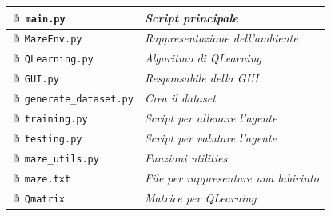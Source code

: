 \begin{center}
	\begin{tabular}{m{15em}  m{20em}}
		\includegraphics[height=0.8em]{img/paper.png} \lstinline[style=cmd]|main.py| & \textit{Script principale}\\[0.2em]
		\hline 
		\includegraphics[height=0.8em]{img/paper.png} \lstinline[style=cmd]|MazeEnv.py| & \textit{Rappresentazione dell'ambiente} \rule{0pt}{2.6ex}\\
		\hline
		\includegraphics[height=0.8em]{img/paper.png} \lstinline[style=cmd]|QLearning.py| & \textit{Algoritmo di QLearning} \rule{0pt}{2.6ex}\\
		\hline
		\includegraphics[height=0.8em]{img/paper.png} \lstinline[style=cmd]|GUI.py| & \textit{Responsabile della GUI} \rule{0pt}{2.6ex}\\
		\hline
		\includegraphics[height=0.8em]{img/paper.png} \lstinline[style=cmd]|generate_dataset.py| & \textit{Crea il dataset} \rule{0pt}{2.6ex}\\
		\hline
		\includegraphics[height=0.8em]{img/paper.png} \lstinline[style=cmd]|training.py| & \textit{Script per allenare l'agente} \rule{0pt}{2.6ex}\\
		\hline
		\includegraphics[height=0.8em]{img/paper.png} \lstinline[style=cmd]|testing.py| & \textit{Script per valutare l'agente} \rule{0pt}{2.6ex}\\
		\hline
		\includegraphics[height=0.8em]{img/paper.png} \lstinline[style=cmd]|maze_utils.py| & \textit{Funzioni utilities} \rule{0pt}{2.6ex}\\
		\hline
		\includegraphics[height=0.8em]{img/paper.png} \lstinline[style=cmd]|maze.txt| & \textit{File per rappresentare una labirinto} \rule{0pt}{2.6ex}\\
		\hline
		\includegraphics[height=0.8em]{img/paper.png} \lstinline[style=cmd]|Qmatrix| & \textit{Matrice per QLearning} \rule{0pt}{2.6ex}\\
	\end{tabular}
\end{center}

